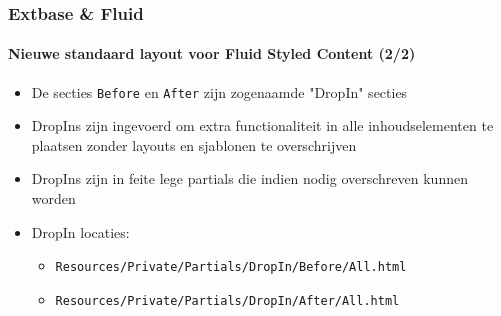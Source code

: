\begin{frame}[fragile]
	\frametitle{Extbase \& Fluid}
	\framesubtitle{Nieuwe standaard layout voor Fluid Styled Content (2/2)}

	\begin{itemize}
		\item De secties \texttt{Before} en \texttt{After} zijn zogenaamde "DropIn" secties
		\item DropIns zijn ingevoerd om extra functionaliteit in alle inhoudselementen te plaatsen
			zonder layouts en sjablonen te overschrijven
		\item DropIns zijn in feite lege partials die indien nodig overschreven kunnen worden
		\item DropIn locaties:
			\begin{itemize}
				\item \texttt{Resources/Private/Partials/DropIn/Before/All.html}
				\item \texttt{Resources/Private/Partials/DropIn/After/All.html}
			\end{itemize}
	\end{itemize}

\end{frame}

